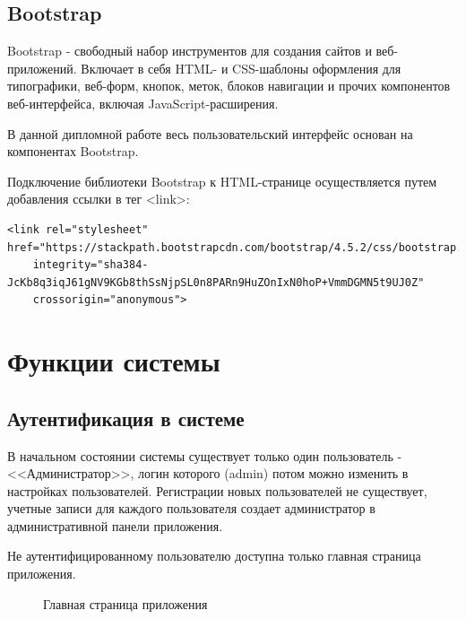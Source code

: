 \documentclass[a4paper]{article}
\begin{document}
\subsection{Bootstrap}

Bootstrap - свободный набор инструментов для создания сайтов и веб-приложений. Включает в себя HTML- и CSS-шаблоны оформления для типографики, веб-форм, кнопок, меток, блоков навигации и прочих компонентов веб-интерфейса, включая JavaScript-расширения.

В данной дипломной работе весь пользовательский интерфейс основан на компонентах Bootstrap. 

Подключение библиотеки Bootstrap к HTML-странице осуществляется путем добавления ссылки в тег <link>:
\hfill\break
{}         
\begin{lstlisting}[label=lis11,caption=Подключение Bootstrap к проекту] 
	<link rel="stylesheet" href="https://stackpath.bootstrapcdn.com/bootstrap/4.5.2/css/bootstrap.min.css"
	integrity="sha384-JcKb8q3iqJ61gNV9KGb8thSsNjpSL0n8PARn9HuZOnIxN0hoP+VmmDGMN5t9UJ0Z"
	crossorigin="anonymous">
\end{lstlisting}

\section{Функции системы}

\subsection{Аутентификация в системе}

В начальном состоянии системы существует только один пользователь - <<Администратор>>, логин которого (admin) потом можно изменить в настройках пользователей. Регистрации новых пользователей не существует, учетные записи для каждого пользователя создает администратор в административной панели приложения.

Не аутентифицированному пользователю доступна только главная страница приложения. 

\begin{figure}[h]
\caption{Главная страница приложения}
\label{fig:image2}
\end{figure}
\end{document}
